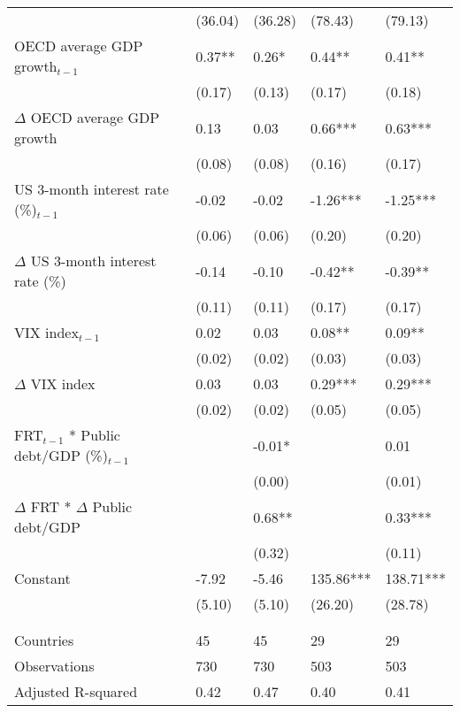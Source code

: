 {\begin{tabular}{lp{3cm}p{3cm}p{3cm}p{3cm}}
   & (36.04) & (36.28) & (78.43) & (79.13) \\ 
  OECD average GDP growth$_{t-1}$ & 0.37** & 0.26* & 0.44** & 0.41** \\ 
   & (0.17) & (0.13) & (0.17) & (0.18) \\ 
  $\Delta$ OECD average GDP growth & 0.13 & 0.03 & 0.66*** & 0.63*** \\ 
   & (0.08) & (0.08) & (0.16) & (0.17) \\ 
  US 3-month interest rate (\%)$_{t-1}$ & -0.02 & -0.02 & -1.26*** & -1.25*** \\ 
   & (0.06) & (0.06) & (0.20) & (0.20) \\ 
  $\Delta$ US 3-month interest rate (\%) & -0.14 & -0.10 & -0.42** & -0.39** \\ 
   & (0.11) & (0.11) & (0.17) & (0.17) \\ 
  VIX index$_{t-1}$ & 0.02 & 0.03 & 0.08** & 0.09** \\ 
   & (0.02) & (0.02) & (0.03) & (0.03) \\ 
  $\Delta$ VIX index & 0.03 & 0.03 & 0.29*** & 0.29*** \\ 
   & (0.02) & (0.02) & (0.05) & (0.05) \\ 
  FRT$_{t-1}$ * Public debt/GDP (\%)$_{t-1}$ &  & -0.01* &  & 0.01 \\ 
   &  & (0.00) &  & (0.01) \\ 
  $\Delta$ FRT * $\Delta$ Public debt/GDP &  & 0.68** &  & 0.33*** \\ 
   &  & (0.32) &  & (0.11) \\ 
  Constant & -7.92 & -5.46 & 135.86*** & 138.71*** \\ 
   & (5.10) & (5.10) & (26.20) & (28.78) \\ 
   &  &  &  &  \\ 
   &  &  &  &  \\ 
  Countries & 45 & 45 & 29 & 29 \\ 
  Observations & 730 & 730 & 503 & 503 \\ 
  Adjusted R-squared & 0.42 & 0.47 & 0.40 & 0.41 \\ 
   \hline
\end{tabular}
}
